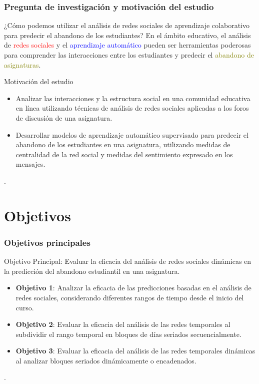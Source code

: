 \documentclass{beamer}
\begin{document}
\begin{frame}
	\frametitle{Pregunta de investigación y motivación del estudio}
	\begin{block}{¿Cómo podemos utilizar el análisis de redes sociales de aprendizaje colaborativo para predecir el abandono de los estudiantes?}
	En el ámbito educativo, el análisis de \textcolor{red}{redes sociales} y el \textcolor{blue}{aprendizaje automático} pueden ser herramientas poderosas para comprender las interacciones entre los estudiantes y predecir el \textcolor{olive}{abandono de asignaturas}. 
	\end{block}
	\begin{block}{Motivación del estudio}
	\begin{itemize}
	\item  Analizar las interacciones y la estructura social en una comunidad educativa en línea utilizando técnicas de análisis de redes sociales aplicadas a los foros de discusión de una asignatura.
	\item  Desarrollar modelos de aprendizaje automático supervisado para predecir el abandono de los estudiantes en una asignatura, utilizando medidas de centralidad de la red social y medidas del sentimiento expresado en los mensajes.
	\end{itemize}. 
	\end{block}
\end{frame}


\section{Objetivos}

\begin{frame}
	\frametitle{Objetivos principales}
	\begin{block}{Objetivo Principal: Evaluar la eficacia del análisis de redes sociales dinámicas en la predicción del abandono estudiantil en una asignatura.}
		\begin{itemize}

			\item  \textbf{Objetivo 1}: Analizar la eficacia de las predicciones basadas en el análisis de redes sociales, considerando diferentes rangos de tiempo desde el inicio del curso.
					
			\item  \textbf{Objetivo 2}: Evaluar la eficacia del análisis de las redes temporales al subdividir el rango temporal en bloques de días seriados secuencialmente.
			
			\item  	\textbf{Objetivo 3}: Evaluar la eficacia del análisis de las redes temporales dinámicas al analizar bloques seriados dinámicamente o encadenados.
					
		\end{itemize}. 
	\end{block}
\end{frame}
\end{document}
